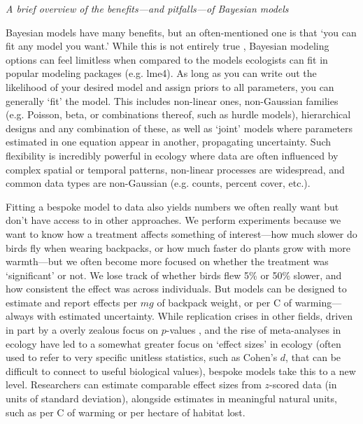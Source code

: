 \documentclass[11pt]{article}
\begin{document}
{\emph{A brief overview of the benefits---and pitfalls---of Bayesian models} 

Bayesian models have many benefits, but an often-mentioned one is that `you can fit any model you want.' While this is not entirely true \citep{BDA,reid2019}, Bayesian modeling options can feel limitless when compared to the models ecologists can fit in popular modeling packages (e.g. \textsf{lme4}). As long as you can write out the likelihood of your desired model \citep[and sometimes even if you can't;][]{Sunnaaker2013} and assign priors to all parameters, you can generally `fit' the model. This includes non-linear ones, non-Gaussian families (e.g. Poisson, beta, or combinations thereof, such as hurdle models), hierarchical designs and any combination of these, as well as `joint' models where parameters estimated in one equation appear in another, propagating uncertainty. Such flexibility is incredibly powerful in ecology where data are often influenced by complex spatial or temporal patterns, non-linear processes are widespread, and common data types are non-Gaussian (e.g. counts, percent cover, etc.). 

Fitting a bespoke model to data also yields numbers we often really want but don't have access to in other approaches. We perform experiments because we want to know how a treatment affects something of interest---how much slower do birds fly when wearing backpacks, or how much faster do plants grow with more warmth---but we often become more focused on whether the treatment was `significant' or not. We lose track of whether birds flew 5\% or 50\% slower, and how consistent the effect was across individuals. But models can be designed to estimate and report effects per $mg$ of backpack weight, or per \degree C of warming---always with estimated uncertainty. While replication crises in other fields, driven in part by a overly zealous focus on $p$-values \citep{halsey2015,loken2017}, and the rise of meta-analyses in ecology \citep{Hampton2013} have led to a somewhat greater focus on `effect sizes' in ecology (often used to refer to very specific unitless statistics, such as Cohen's $d$, that can be difficult to connect to useful biological values), bespoke models take this to a new level. Researchers can estimate comparable effect sizes from $z$-scored data (in units of standard deviation), alongside estimates in meaningful natural units, such as per \degree C of warming or per hectare of habitat lost.

}
\end{document}
